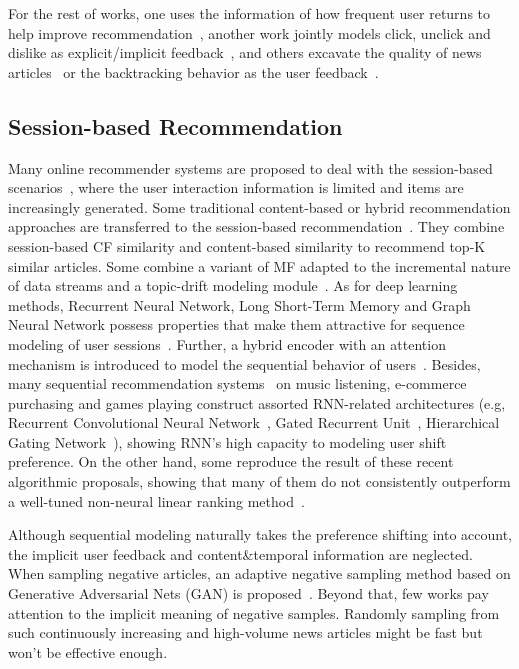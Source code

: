 For the rest of works, one uses the information of how frequent user returns to help improve recommendation~\cite{zheng2018drn}, another work jointly models click, unclick and dislike as explicit/implicit feedback~\cite{xie2020deep}, and others excavate the quality of news articles~\cite{lu_quality_2019} or the backtracking behavior as the user feedback~\cite{smadja_understanding_2019}.
\subsection{Session-based Recommendation}
Many online recommender systems are proposed to deal with the session-based scenarios~\cite{epure_recommending_2017,zhou_variational_2019}, where the user interaction information is limited and items are increasingly generated. Some traditional content-based or hybrid recommendation approaches are transferred to the session-based recommendation~\cite{sottocornola2018session}.  They combine session-based CF similarity and content-based similarity to recommend top-K similar articles. Some combine a variant of MF adapted to the incremental nature of data streams and a topic-drift modeling module~\cite{al2018adaptive}. As for deep learning methods, Recurrent Neural Network, Long Short-Term Memory and Graph Neural Network possess properties that make them attractive for sequence modeling of user sessions~\cite{guo_streaming_2019,hidasi2015session,wang2019modeling,moreira_news_2018,wu2019session}. Further, a hybrid encoder with an attention mechanism is introduced to model the sequential behavior of users~\cite{li2017neural,liu2018stamp,xu2019time,song_islf_2019,zhang_feature-level_2019}. 
Besides, many sequential recommendation systems~\cite{pereira2019online,xu2019graph} on music listening, e-commerce purchasing and games playing construct assorted RNN-related architectures (e.g, Recurrent Convolutional Neural Network~\cite{xu_recurrent_2019}, Gated Recurrent Unit~\cite{hidasi2018recurrent}, Hierarchical Gating Network~\cite{xiao2019hierarchical,ma2019hierarchical}), showing RNN's high capacity to modeling user shift preference. On the other hand, some reproduce the result of these recent algorithmic proposals, showing that many of them do not consistently outperform a well-tuned non-neural linear ranking method~\cite{dacrema_are_2019,ludewig_performance_2019}.

Although sequential modeling naturally takes the preference shifting into account, the implicit user feedback and content\&temporal information are neglected. When sampling negative articles, an adaptive negative sampling method based on Generative Adversarial Nets (GAN) is proposed~\cite{wang_neural_2018}. Beyond that, few works pay attention to the implicit meaning of negative samples. Randomly sampling from such continuously increasing and high-volume news articles might be fast but won't be effective enough.

